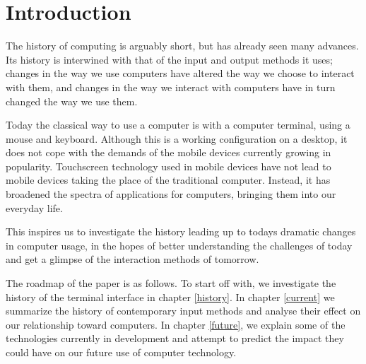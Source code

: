 
\section{Introduction}

The history of computing is arguably short, but has already seen many advances. Its history is interwined with that of the input and output methods it uses; changes in the way we use computers have altered the way we choose to interact with them, and changes in the way we interact with computers have in turn changed the way we use them.

Today the classical way to use a computer is with a computer terminal, using a mouse and keyboard. Although this is a working configuration on a desktop, it does not cope with the demands of the mobile devices currently growing in popularity. Touchscreen technology used in mobile devices have not lead to mobile devices taking the place of the traditional computer. Instead, it has broadened the spectra of applications for computers, bringing them into our everyday life.

This inspires us to investigate the history leading up to todays dramatic changes in computer usage, in the hopes of better understanding the challenges of today and get a glimpse of the interaction methods of tomorrow.

The roadmap of the paper is as follows. To start off with, we investigate the history of the terminal interface in chapter \ref{history}. In chapter \ref{current} we summarize the history of contemporary input methods and analyse their effect on our relationship toward computers. In chapter \ref{future}, we explain some of the technologies currently in development and attempt to predict the impact they could have on our future use of computer technology.

